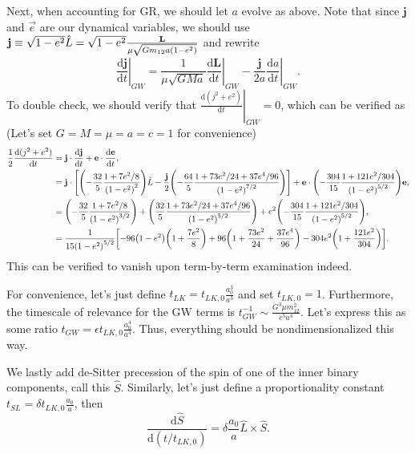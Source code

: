 \documentclass[11pt,
        usenames, %
        dvipsnames %
    ]{article}
\newcommand*{\rd}[2]{\frac{\mathrm{d}#1}{\mathrm{d}#2}}
\newcommand*{\bm}[1]{\boldsymbol{\mathbf{#1}}}
\newcommand*{\at}[1]{\left.#1\right|}
\DeclarePairedDelimiter\p{\lparen}{\rparen}
\DeclarePairedDelimiter\s{\lbrack}{\rbrack}
\begin{document}
Next, when accounting for GR, we should let $a$ evolve as above. Note that since
$\bm{j}$ and $\vec{e}$ are our dynamical variables, we should use $\bm{j} \equiv
\sqrt{1 - e^2} \hat{L} = \sqrt{1 - e^2}\frac{\bm{L}}{\mu \sqrt{Gm_{12}a\p*{1 -
e^2}}}$ and rewrite
\begin{equation}
    \at{\rd{\bm{j}}{t}}_{GW} = \frac{1}{\mu\sqrt{GMa}}\at{\rd{\bm{L}}{t}}_{GW}
        - \frac{\bm{j}}{2a}\at{\rd{a}{t}}_{GW}.
\end{equation}
To double check, we should verify that $\at{\rd{(j^2 + e^2)}{t}}_{GW} = 0$,
which can be verified as (Let's set $G = M = \mu = a = c = 1$ for convenience)
\begin{align}
    \frac{1}{2}\rd{(j^2 + e^2)}{t}
        &= \bm{j} \cdot \rd{\bm{j}}{t} + \bm{e} \cdot \rd{\bm{e}}{t},\\
        &= \bm{j} \cdot \s*{
            \p*{-\frac{32}{5}\frac{1 + 7e^2/8}{\p*{1 - e^2}^2}}\hat{L}
                - \frac{\bm{j}}{2}\p*{-\frac{64}{5}
                    \frac{1 + 73e^2/24 + 37e^4/96}{\p*{1 - e^2}^{7/2}}}}
            + \bm{e} \cdot
                \p*{-\frac{304}{15}\frac{1 + 121e^2/304}{\p*{1 - e^2}^{5/2}}}
                \bm{e},\\
        &= \p*{-\frac{32}{5}\frac{1 + 7e^2/8}{\p*{1 - e^2}^{3/2}}}
                + \p*{\frac{32}{5}
                    \frac{1 + 73e^2/24 + 37e^4/96}{\p*{1 - e^2}^{5/2}}}
            + e^2 \p*{-\frac{304}{15}\frac{1 + 121e^2/304}{\p*{1 - e^2}^{5/2}}}
                ,\\
        &= \frac{1}{15\p*{1 - e^2}^{5/2}}\s*{
            -96\p*{1 - e^2}\p*{1 + \frac{7e^2}{8}}
                + 96\p*{1 + \frac{73e^2}{24} + \frac{37e^4}{96}}
                - 304e^2\p*{1 + \frac{121e^2}{304}}}.
\end{align}
This can be verified to vanish upon term-by-term examination indeed.

For convenience, let's just define $t_{LK} = t_{LK,0} \frac{a_0^3}{a^3}$
and set $t_{LK, 0} = 1$. Furthermore, the timescale of relevance for the GW
terms is $t_{GW}^{-1} \sim \frac{G^3 \mu m_{12}^2}{c^5a^4}$. Let's express this
as some ratio $t_{GW} = \epsilon t_{LK, 0}\frac{a_0^4}{a^4}$. Thus, everything
should be nondimensionalized this way.

We lastly add de-Sitter precession of the spin of one of the inner binary
components, call this $\hat{S}$. Similarly, let's just define a proportionality
constant $t_{SL} = \delta t_{LK, 0}\frac{a_0}{a}$, then
\begin{equation}
    \rd{\hat{S}}{(t / t_{LK, 0})} = \delta \frac{a_0}{a} \hat{L} \times \hat{S}.
\end{equation}
\end{document}
